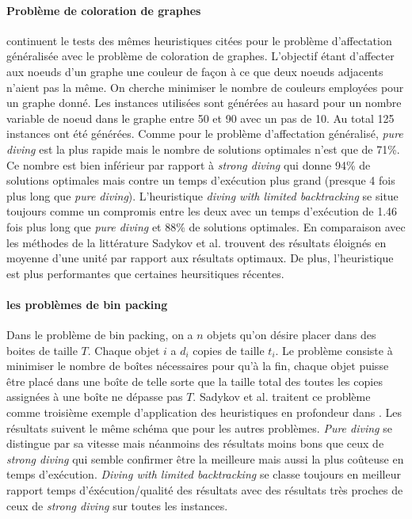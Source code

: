 \documentclass[12pt,a4paper,oneside]{book}
\theoremstyle{definition}
\begin{document}
	    \paragraph{Problème de coloration de graphes}
	        \cite{sadykov2018primal} continuent le tests des mêmes heuristiques citées pour le problème d'affectation généralisée avec le problème de coloration de graphes. L'objectif étant d'affecter aux noeuds d'un graphe une couleur de façon à ce que deux noeuds adjacents n'aient pas la même. On cherche minimiser le nombre de couleurs employées pour un graphe donné.
	        Les instances utilisées sont générées au hasard pour un nombre variable de noeud dans le graphe entre 50 et 90 avec un pas de 10. Au total 125 instances ont été générées. Comme pour le problème d'affectation généralisé, \textit{pure diving} est la plus rapide mais le nombre de solutions optimales n'est que de 71\%. Ce nombre est bien inférieur par rapport à \textit{strong diving} qui donne 94\% de solutions optimales mais contre un temps d'exécution plus grand (presque 4 fois plus long que \textit{pure diving}). L'heuristique \textit{diving with limited backtracking} se situe toujours comme un compromis entre les deux avec un temps d'exécution de 1.46 fois plus long que \textit{pure diving} et 88\% de solutions optimales. En comparaison avec les méthodes de la littérature Sadykov et al. trouvent des résultats éloignés en moyenne d'une unité par rapport aux résultats optimaux. De plus, l'heuristique est plus performantes que certaines heursitiques récentes. 
	    
	    \paragraph{ les problèmes de bin packing}
	       Dans le problème de bin packing, on a $n$ objets qu'on désire placer dans des boites de taille $T$. Chaque objet $i$ a $d_i$ copies de taille $t_i$. Le problème consiste à minimiser le nombre de boîtes nécessaires pour qu'à la fin, chaque objet puisse être placé dans une boîte de telle sorte que la taille total des toutes les copies assignées à une boîte ne dépasse pas $T$. Sadykov et al. traitent ce problème comme troisième exemple d'application des heuristiques en profondeur dans \cite{sadykov2018primal}. Les résultats suivent le même schéma que pour les autres problèmes. \textit{Pure diving} se distingue par sa vitesse mais néanmoins des résultats moins bons que ceux de \textit{strong diving} qui semble confirmer être la meilleure mais aussi la plus coûteuse en temps d'exécution. \textit{Diving with limited backtracking} se classe toujours en meilleur rapport temps d'éxécution/qualité des résultats avec des résultats très proches de ceux de \textit{strong diving} sur toutes les instances.
\end{document}
